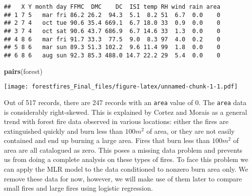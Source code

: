 \documentclass[]{article}
\newenvironment{Shaded}{\begin{snugshade}}{\end{snugshade}}
\newcommand{\KeywordTok}[1]{\textcolor[rgb]{0.13,0.29,0.53}{\textbf{#1}}}
\newcommand{\StringTok}[1]{\textcolor[rgb]{0.31,0.60,0.02}{#1}}
\newcommand{\CommentTok}[1]{\textcolor[rgb]{0.56,0.35,0.01}{\textit{#1}}}
\newcommand{\OperatorTok}[1]{\textcolor[rgb]{0.81,0.36,0.00}{\textbf{#1}}}
\newcommand{\NormalTok}[1]{#1}
\begin{document}
\begin{Shaded}
\end{Shaded}

\begin{verbatim}
##   X Y month day FFMC  DMC    DC  ISI temp RH wind rain area
## 1 7 5   mar fri 86.2 26.2  94.3  5.1  8.2 51  6.7  0.0    0
## 2 7 4   oct tue 90.6 35.4 669.1  6.7 18.0 33  0.9  0.0    0
## 3 7 4   oct sat 90.6 43.7 686.9  6.7 14.6 33  1.3  0.0    0
## 4 8 6   mar fri 91.7 33.3  77.5  9.0  8.3 97  4.0  0.2    0
## 5 8 6   mar sun 89.3 51.3 102.2  9.6 11.4 99  1.8  0.0    0
## 6 8 6   aug sun 92.3 85.3 488.0 14.7 22.2 29  5.4  0.0    0
\end{verbatim}

\begin{Shaded}
\begin{Highlighting}[]
\KeywordTok{pairs}\NormalTok{(forest)}
\end{Highlighting}
\end{Shaded}

\texttt{[image: forestfires\_Final\_files/figure-latex/unnamed-chunk-1-1.pdf]}

Out of 517 records, there are 247 records with an \texttt{area} value of
0. The \texttt{area} data is considerably right-skewed. This is
explained by Cortez and Morais as a general trend with forest fire data
observed in various locations: either the fires are extinguished quickly
and burn less than \(100m^2\) of area, or they are not easily contained
and end up burning a large area. Fires that burn less than \(100m^2\) of
area are all catalogued as zero. This poses a missing data problem and
prevents us from doing a complete analysis on these types of fires. To
face this problem we can apply the MLR model to the data conditioned to
nonzero burn area only. We remove these data for now, however, we will
make use of them later to compare small fires and large fires using
logistic regression.
\end{document}
